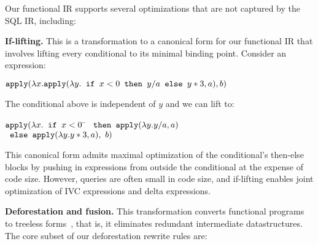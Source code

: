 Our functional IR supports several optimizations that are not captured by the
SQL IR, including:

\vspace{1mm}
\noindent\textbf{If-lifting.} This is a transformation to a canonical form
for our functional IR that involves lifting every conditional to its minimal
binding point. Consider an expression:

$\mbox{\texttt{apply}}(\lambda x. \mbox{\texttt{apply}}(\lambda y.
  \mbox{\texttt{ if }} x < 0 \mbox{\texttt{ then }} y/a
                             \mbox{\texttt{ else }} y*3, a), b)$

\vspace{1mm}
\noindent The conditional above is independent of $y$ and we can lift to:

\vspace{-2mm}
\begin{tabbing}
$\mbox{\texttt{apply}}(\lambda x.
  \mbox{\texttt{ if }} x < 0$ \= $\mbox{\texttt{ then }}
    \mbox{\texttt{apply}}(\lambda y. y/a, a)$\\
\> $\mbox{\texttt{ else }} \mbox{\texttt{apply}}(\lambda y. y*3, a),\ b)$
\end{tabbing}


\vspace{-2mm}  
\noindent This canonical form admits maximal optimization of the conditional's
then-else blocks by pushing in expressions from outside the conditional
at the expense of code size. However, queries are often small
in code size, and if-lifting enables joint optimization of IVC expressions and
delta expressions.


\vspace{1mm}
\noindent\textbf{Deforestation and fusion.} This transformation converts
functional programs to treeless forms~\cite{marlow-fp:92}, that is, it eliminates
redundant intermediate datastructures. The core subset of our deforestation
rewrite rules are:

\def\xform{\mbox{\texttt{:-}}}
\def\fst{\mbox{\texttt{fst}}}

